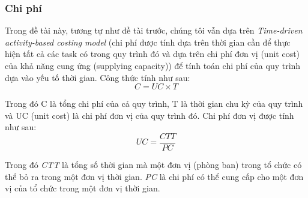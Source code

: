 \subsubsection{Chi phí}
Trong đề tài này, tương tự như đề tài trước, chúng tôi vẫn dựa trên \emph{Time-driven activity-based costing
model} (chi phí được tính dựa trên thời gian cần để thực hiện tất cả các task có trong quy trình đó và dựa trên chi phí đơn vị (unit cost) của khả năng cung ứng (supplying
capacity)) để tính toán chi phí của quy trình dựa vào yếu tố thời gian. Công thức tính như sau:
\[ C = UC \times T \]
\par
Trong đó C là tổng chi phí của cả quy trình, T là thời gian chu kỳ của quy trình và UC (unit cost) là chi phí đơn vị của quy trình đó. Chi phí đơn vị được tính như sau:
\[ UC = \frac{CTT}{PC}\]
\par
Trong đó \emph{CTT} là tổng số thời gian mà một đơn vị (phòng ban) trong tổ chức có thể bỏ ra trong một đơn vị thời gian. \emph{PC} là chi phí có thể cung cấp cho một đơn vị của tổ chức trong một đơn vị thời gian.